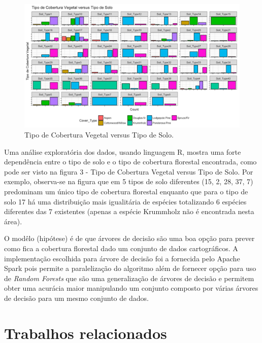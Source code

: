 \documentclass[12pt]{article}
\begin{document}
\begin{figure}[!ht]
	\centering
	\begin{minipage}[t]{0.95\textwidth}
        \includegraphics[width=\textwidth]{img/cover-x-soiltype.png}
        \centering
	\end{minipage}
	\caption
	{
	    Tipo de Cobertura Vegetal versus Tipo de Solo.
	}
	\label{fig:vegetalxsolo}
\end{figure}

Uma análise exploratória dos dados, usando linguagem R, mostra uma forte dependência entre o tipo de solo e o tipo de cobertura florestal encontrada, como pode ser visto na figura 3 - Tipo de Cobertura Vegetal versus Tipo de Solo. Por exemplo, observa-se na figura que em 5 tipos de solo diferentes (15, 2, 28, 37, 7) predominam um único tipo de cobertura florestal enquanto que para o tipo de solo 17 há uma distribuição mais igualitária de espécies totalizando 6 espécies diferentes das 7 existentes (apenas a espécie Krummholz não é encontrada nesta área).

O modêlo (hipótese) é de que árvores de decisão são uma boa opção para prever como fica a cobertura florestal dado um conjunto de dados cartográficos. A implementação escolhida para árvore de decisão foi a fornecida pelo Apache Spark pois permite a paralelização do algoritmo além de fornecer opção para uso de \emph{Random Forests} que são uma generalização de árvores de decisão e permitem obter uma acurácia maior manipulando um conjunto composto por várias árvores de decisão para um mesmo conjunto de dados.

\section{Trabalhos relacionados}
\label{sec:Trabalhos relacionados}
\end{document}
